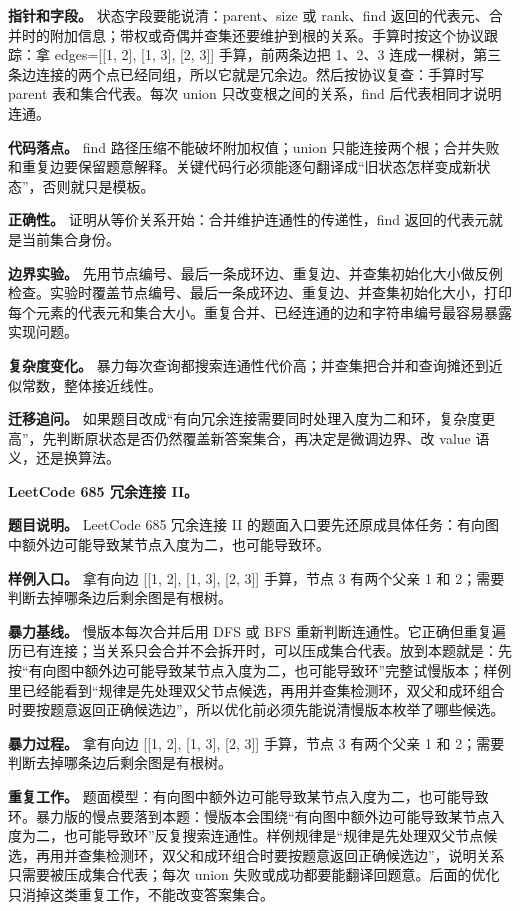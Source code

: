 \textbf{指针和字段。} 状态字段要能说清：parent、size 或 rank、find 返回的代表元、合并时的附加信息；带权或奇偶并查集还要维护到根的关系。手算时按这个协议跟踪：拿 edges=[[1, 2], [1, 3], [2, 3]] 手算，前两条边把 1、2、3 连成一棵树，第三条边连接的两个点已经同组，所以它就是冗余边。然后按协议复查：手算时写 parent 表和集合代表。每次 union 只改变根之间的关系，find 后代表相同才说明连通。

\textbf{代码落点。} find 路径压缩不能破坏附加权值；union 只能连接两个根；合并失败和重复边要保留题意解释。关键代码行必须能逐句翻译成“旧状态怎样变成新状态”，否则就只是模板。

\textbf{正确性。} 证明从等价关系开始：合并维护连通性的传递性，find 返回的代表元就是当前集合身份。

\textbf{边界实验。} 先用节点编号、最后一条成环边、重复边、并查集初始化大小做反例检查。实验时覆盖节点编号、最后一条成环边、重复边、并查集初始化大小，打印每个元素的代表元和集合大小。重复合并、已经连通的边和字符串编号最容易暴露实现问题。

\textbf{复杂度变化。} 暴力每次查询都搜索连通性代价高；并查集把合并和查询摊还到近似常数，整体接近线性。

\textbf{迁移追问。} 如果题目改成“有向冗余连接需要同时处理入度为二和环，复杂度更高”，先判断原状态是否仍然覆盖新答案集合，再决定是微调边界、改 value 语义，还是换算法。

\noindent\textbf{LeetCode 685 冗余连接 II。}

\textbf{题目说明。} LeetCode 685 冗余连接 II 的题面入口要先还原成具体任务：有向图中额外边可能导致某节点入度为二，也可能导致环。

\textbf{样例入口。} 拿有向边 [[1, 2], [1, 3], [2, 3]] 手算，节点 3 有两个父亲 1 和 2；需要判断去掉哪条边后剩余图是有根树。

\textbf{暴力基线。} 慢版本每次合并后用 DFS 或 BFS 重新判断连通性。它正确但重复遍历已有连接；当关系只会合并不会拆开时，可以压成集合代表。放到本题就是：先按“有向图中额外边可能导致某节点入度为二，也可能导致环”完整试慢版本；样例里已经能看到“规律是先处理双父节点候选，再用并查集检测环，双父和成环组合时要按题意返回正确候选边”，所以优化前必须先能说清慢版本枚举了哪些候选。

\textbf{暴力过程。} 拿有向边 [[1, 2], [1, 3], [2, 3]] 手算，节点 3 有两个父亲 1 和 2；需要判断去掉哪条边后剩余图是有根树。

\textbf{重复工作。} 题面模型：有向图中额外边可能导致某节点入度为二，也可能导致环。暴力版的慢点要落到本题：慢版本会围绕“有向图中额外边可能导致某节点入度为二，也可能导致环”反复搜索连通性。样例规律是“规律是先处理双父节点候选，再用并查集检测环，双父和成环组合时要按题意返回正确候选边”，说明关系只需要被压成集合代表；每次 union 失败或成功都要能翻译回题意。后面的优化只消掉这类重复工作，不能改变答案集合。

